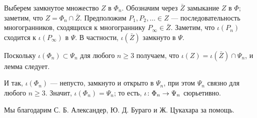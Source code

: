 \documentclass[oneside,a4paper]{article}
\begin{document}
Выберем замкнутое множество $Z$ в $\Phi_n$.
Обозначим через $\bar Z$ замыкание $Z$ в $\Phi$; заметим, что $Z=\Phi_n\cap \bar Z$.
Предположим $P_1,P_2,\dots\in Z$ --- последовательность многогранников, сходящихся к многограннику $P_\infty\in\bar Z$.
Заметим, что $\iota(P_n)$ сходится к $\iota(P_\infty)$  в $\Psi$.
В частности, $\iota(\bar Z)$ замкнуто в $\Psi$.

Поскольку $\iota(\Phi_n)\subset \Psi_n$ для любого $n\ge 3$ получаем, что  $\iota (Z)=\iota(\bar Z)\cap \Psi_n$, и лемма следует. 

\medskip

И так, $\iota(\Phi_n)$ --- непусто, замкнуто и открыто в $\Psi_n$, при этом $\Psi_n$ связно для любого $n\ge 3$.
Значит, $\iota(\Phi_n)=\Psi_n$; то есть, $\iota\:\Phi_n\z\to\Psi_n$ сюрьетивно.
\qeds

 Мы благодарим С. Б. Александер, Ю. Д. Бураго и Ж. Цукахара за помощь. 

\sloppy
\printbibliography[heading=bibintoc]
\fussy
\end{document}
